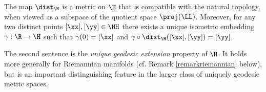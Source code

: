 \begin{proposition}
\label{propositionROSSONCT}
The map $\dist_\H$ is a metric on $\H$ that is compatible with the natural topology, when viewed as a subspace of the quotient space $\proj(\LL)$. Moreover, for any two distinct points $[\xx],[\yy]\in\HH$ there exists a unique isometric embedding $\gamma:\R\to \H$ such that $\gamma(0) = [\xx]$ and $\gamma\circ\dist_\H([\xx],[\yy]) = [\yy]$.
\end{proposition}
\begin{remark}
The second sentence is the \emph{unique geodesic extension} property of $\H$. It holds more generally for Riemannian manifolds (cf. Remark \ref{remarkriemannian} below), but is an important distinguishing feature in the larger class of uniquely geodesic metric spaces.
\end{remark}
